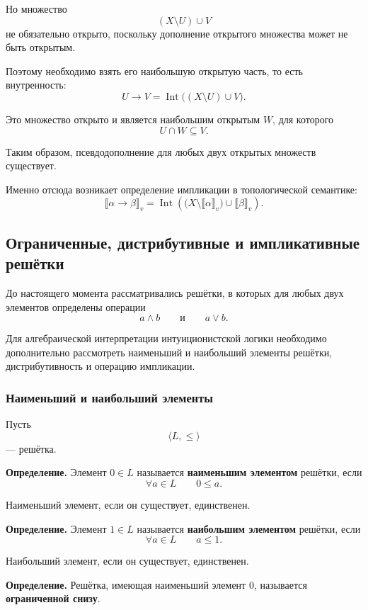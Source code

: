 \documentclass[12pt,a4paper,oneside,openany]{book}
\theoremstyle{definition}
\theoremstyle{plain}
\theoremstyle{remark}
\begin{document}
Но множество
\[
(X\setminus U)\cup V
\]
не обязательно открыто, поскольку дополнение открытого множества
может не быть открытым.

Поэтому необходимо взять его наибольшую открытую часть, то есть
внутренность:
\[
\boxed{
U\to V
=
\operatorname{Int}\bigl((X\setminus U)\cup V\bigr).
}
\]

Это множество открыто и является наибольшим открытым \(W\), для
которого
\[
U\cap W\subseteq V.
\]

Таким образом, псевдодополнение для любых двух открытых множеств
существует.

Именно отсюда возникает определение импликации в топологической
семантике:
\[
\llbracket\alpha\to\beta\rrbracket_v
=
\operatorname{Int}
\left(
\bigl(
X\setminus\llbracket\alpha\rrbracket_v
\bigr)
\cup
\llbracket\beta\rrbracket_v
\right).
\]


\subsection{Ограниченные, дистрибутивные и импликативные решётки}

До настоящего момента рассматривались решётки, в которых для любых
двух элементов определены операции
\[
a\wedge b
\qquad\text{и}\qquad
a\vee b.
\]

Для алгебраической интерпретации интуиционистской логики необходимо
дополнительно рассмотреть наименьший и наибольший элементы решётки,
дистрибутивность и операцию импликации.

\subsubsection{Наименьший и наибольший элементы}

Пусть
\[
\langle L,\leq\rangle
\]
--- решётка.

\textbf{Определение.}
Элемент \(0\in L\) называется \textbf{наименьшим элементом} решётки,
если
\[
\forall a\in L
\qquad
0\leq a.
\]

Наименьший элемент, если он существует, единственен.


\textbf{Определение.}
Элемент \(1\in L\) называется \textbf{наибольшим элементом} решётки,
если
\[
\forall a\in L
\qquad
a\leq1.
\]

Наибольший элемент, если он существует, единственен.


\textbf{Определение.}
Решётка, имеющая наименьший элемент \(0\), называется
\textbf{ограниченной снизу}.
\end{document}

